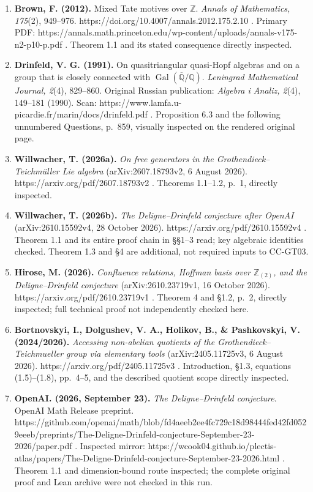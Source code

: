 \begin{enumerate}
\def\labelenumi{\arabic{enumi}.}
\tightlist
\item
  \textbf{Brown, F. (2012).} Mixed Tate motives over \(\mathbb Z\).
  \emph{Annals of Mathematics, 175}(2), 949--976.
  https://doi.org/10.4007/annals.2012.175.2.10 . Primary PDF:
  https://annals.math.princeton.edu/wp-content/uploads/annals-v175-n2-p10-p.pdf
  . Theorem 1.1 and its stated consequence directly inspected.
\item
  \textbf{Drinfeld, V. G. (1991).} On quasitriangular quasi-Hopf
  algebras and on a group that is closely connected with
  \(\operatorname{Gal}(\overline{\mathbb Q}/\mathbb Q)\).
  \emph{Leningrad Mathematical Journal, 2}(4), 829--860. Original
  Russian publication: \emph{Algebra i Analiz, 2}(4), 149--181 (1990).
  Scan: https://www.lamfa.u-picardie.fr/marin/docs/drinfeld.pdf .
  Proposition 6.3 and the following unnumbered Questions, p.~859,
  visually inspected on the rendered original page.
\item
  \textbf{Willwacher, T. (2026a).} \emph{On free generators in the
  Grothendieck--Teichmüller Lie algebra} (arXiv:2607.18793v2, 6 August
  2026). https://arxiv.org/pdf/2607.18793v2 . Theorems 1.1--1.2, p.~1,
  directly inspected.
\item
  \textbf{Willwacher, T. (2026b).} \emph{The Deligne--Drinfeld
  conjecture after OpenAI} (arXiv:2610.15592v4, 28 October 2026).
  https://arxiv.org/pdf/2610.15592v4 . Theorem 1.1 and its entire proof
  chain in §§1--3 read; key algebraic identities checked. Theorem 1.3
  and §4 are additional, not required inputs to CC-GT03.
\item
  \textbf{Hirose, M. (2026).} \emph{Confluence relations, Hoffman basis
  over \(\mathbb Z_{(2)}\), and the Deligne--Drinfeld conjecture}
  (arXiv:2610.23719v1, 16 October 2026).
  https://arxiv.org/pdf/2610.23719v1 . Theorem 4 and §1.2, p.~2,
  directly inspected; full technical proof not independently checked
  here.
\item
  \textbf{Bortnovskyi, I., Dolgushev, V. A., Holikov, B., \&
  Pashkovskyi, V. (2024/2026).} \emph{Accessing non-abelian quotients of
  the Grothendieck--Teichmueller group via elementary tools}
  (arXiv:2405.11725v3, 6 August 2026).
  https://arxiv.org/pdf/2405.11725v3 . Introduction, §1.3, equations
  (1.5)--(1.8), pp.~4--5, and the described quotient scope directly
  inspected.
\item
  \textbf{OpenAI. (2026, September 23).} \emph{The Deligne--Drinfeld
  conjecture}. OpenAI Math Release preprint.
  https://github.com/openai/math/blob/fd4aeeb2ee4fc729c18d98444fed42fd0529eeeb/preprints/The-Deligne-Drinfeld-conjecture-September-23-2026/paper.pdf
  . Inspected mirror:
  https://wcook04.github.io/plectis-atlas/papers/The-Deligne-Drinfeld-conjecture-September-23-2026.html
  . Theorem 1.1 and dimension-bound route inspected; the complete
  original proof and Lean archive were not checked in this run.
\end{enumerate}
